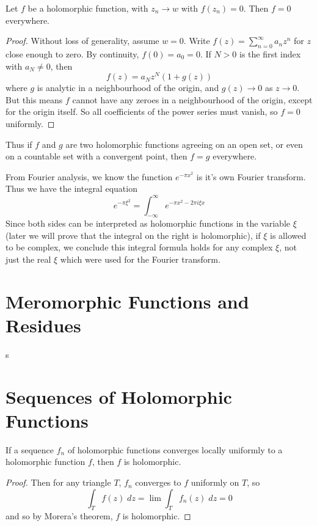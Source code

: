 \begin{theorem}
    Let $f$ be a holomorphic function, with $z_n \to w$ with $f(z_n) = 0$. Then $f = 0$ everywhere.
\end{theorem}
\begin{proof}
    Without loss of generality, assume $w = 0$. Write $f(z) = \sum_{n = 0}^\infty a_n z^n$ for $z$ close enough to zero. By continuity, $f(0) = a_0 = 0$. If $N > 0$ is the first index with $a_N \neq 0$, then
    \[ f(z) = a_N z^N(1 + g(z)) \]
    where $g$ is analytic in a neighbourhood of the origin, and $g(z) \to 0$ as $z \to 0$. But this means $f$ cannot have any zeroes in a neighbourhood of the origin, except for the origin itself. So all coefficients of the power series must vanish, so $f = 0$ uniformly.
\end{proof}

Thus if $f$ and $g$ are two holomorphic functions agreeing on an open set, or even on a countable set with a convergent point, then $f = g$ everywhere.

\begin{example}
    From Fourier analysis, we know the function $e^{-\pi x^2}$ is it's own Fourier transform. Thus we have the integral equation
    \[ e^{- \pi \xi^2} = \int_{-\infty}^\infty e^{- \pi x^2 - 2 \pi i \xi x} \]
    Since both sides can be interpreted as holomorphic functions in the variable $\xi$ (later we will prove that the integral on the right is holomorphic), if $\xi$ is allowed to be complex, we conclude this integral formula holds for any complex $\xi$, not just the real $\xi$ which were used for the Fourier transform.
\end{example}

\section{Meromorphic Functions and Residues}

s




\section{Sequences of Holomorphic Functions}

\begin{theorem}
    If a sequence $f_n$ of holomorphic functions converges locally uniformly to a holomorphic function $f$, then $f$ is holomorphic.
\end{theorem}
\begin{proof}
    Then for any triangle $T$, $f_n$ converges to $f$ uniformly on $T$, so
    \[ \int_T f(z)\; dz = \lim \int_T f_n(z)\; dz = 0 \]
    and so by Morera's theorem, $f$ is holomorphic.
\end{proof}

